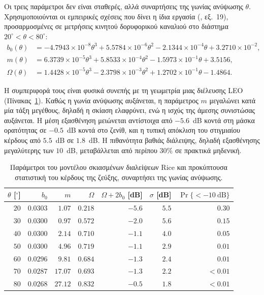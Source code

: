 Οι τρεις παράμετροι δεν είναι σταθερές, αλλά συναρτήσεις της γωνίας
ανύψωσης $\theta$. Χρησιμοποιούνται οι εμπειρικές σχέσεις που δίνει η
ίδια εργασία (\cite{abdi2003lms}, εξ.~19), προσαρμοσμένες σε μετρήσεις
κινητού δορυφορικού καναλιού στο διάστημα $20^\circ < \theta < 80^\circ$:
\begin{align}
b_0(\theta) &= -4.7943\!\times\!10^{-8}\theta^{3}
 + 5.5784\!\times\!10^{-6}\theta^{2}
 - 2.1344\!\times\!10^{-4}\theta + 3.2710\!\times\!10^{-2}, \nonumber\\
m(\theta) &= 6.3739\!\times\!10^{-5}\theta^{3}
 + 5.8533\!\times\!10^{-4}\theta^{2}
 - 1.5973\!\times\!10^{-1}\theta + 3.5156, \label{eq:sat-fading-elev}\\
\Omega(\theta) &= 1.4428\!\times\!10^{-5}\theta^{3}
 - 2.3798\!\times\!10^{-3}\theta^{2}
 + 1.2702\!\times\!10^{-1}\theta - 1.4864. \nonumber
\end{align}

Η συμπεριφορά τους είναι φυσικά συνεπής με τη γεωμετρία μιας διέλευσης
LEO (Πίνακας~\ref{tab:sat-fading-elev}). Καθώς η γωνία ανύψωσης αυξάνεται,
η παράμετρος $m$ μεγαλώνει κατά μία τάξη μεγέθους, δηλαδή η σκίαση
ελαφρύνει, ενώ η ισχύς της άμεσης συνιστώσας αυξάνεται. Η μέση εξασθένηση
μειώνεται αντίστοιχα από $-5.6$~dB κοντά στη μάσκα ορατότητας σε
$-0.5$~dB κοντά στο ζενίθ, και η τυπική απόκλιση του στιγμιαίου κέρδους
από $5.5$~dB σε $1.8$~dB. Η πιθανότητα βαθιάς διάλειψης, δηλαδή
εξασθένησης μεγαλύτερης των $10$~dB, μεταβάλλεται από περίπου $30\%$ σε
πρακτικά μηδενική.

\begin{table}[htbp]
\centering
\caption{Παράμετροι του μοντέλου σκιασμένων διαλείψεων Rice και
προκύπτουσα στατιστική του κέρδους της ζεύξης, συναρτήσει της γωνίας
ανύψωσης.}
\label{tab:sat-fading-elev}
\small
\begin{tabular}{@{}rrrrrrr@{}}
\toprule
$\theta$ [$^\circ$] & $b_0$ & $m$ & $\Omega$ &
$\Omega + 2b_0$ [dB] & $\sigma$ [dB] & $\Pr\{<-10~\text{dB}\}$ \\
\midrule
$20$ & $0.0303$ & $1.07$  & $0.218$ & $-5.6$ & $5.5$ & $0.30$ \\
$30$ & $0.0300$ & $0.97$  & $0.572$ & $-2.0$ & $5.6$ & $0.15$ \\
$40$ & $0.0300$ & $2.14$  & $0.710$ & $-1.1$ & $4.0$ & $0.05$ \\
$50$ & $0.0300$ & $4.96$  & $0.719$ & $-1.1$ & $2.9$ & $0.01$ \\
$60$ & $0.0296$ & $9.81$  & $0.684$ & $-1.3$ & $2.4$ & $0.01$ \\
$70$ & $0.0287$ & $17.07$ & $0.693$ & $-1.3$ & $2.2$ & $<0.01$ \\
$80$ & $0.0268$ & $27.12$ & $0.832$ & $-0.5$ & $1.8$ & $<0.01$ \\
\bottomrule
\end{tabular}
\end{table}

